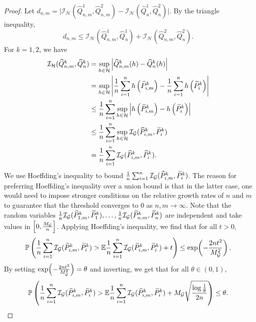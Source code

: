 \begin{proof}
Let $d_{n,m} = \big| \mathcal{I}_{\mathcal{H}}(\widehat{Q}^1_{n,m}, \widehat{Q}^2_{n,m}) - \mathcal{I}_{\mathcal{H}}(\widehat{Q}^1_n,\widehat{Q}^2_n) \big|$. By the triangle inequality,
\[
d_{n,m} \leq \mathcal{I}_\mathcal{H}(\widehat{Q}^1_{n,m}, \widehat{Q}^1_n) + \mathcal{I}_\mathcal{H}(\widehat{Q}^2_{n,m}, \widehat{Q}^2_n).
\]
For $k =1,2$, we have
\begin{align*}
\mathcal{I}_\mathcal{H}(\widehat{Q}^k_{n,m}, \widehat{Q}^k_n) &= \sup_{h \in \mathcal{H}}\left|\widehat{Q}^k_{n,m}(h) - \widehat{Q}^k_n(h) \right|\\
& = \sup_{h\in \mathcal{H}} \left| \frac{1}{n}\sum_{i = 1}^n h\left(\widehat{P}^k_{i,m} \right) - \frac{1}{n}\sum_{i = 1}^n h\left(\widetilde{P}^k_i \right) \right|  \\
& \leq \frac{1}{n}\sum_{i = 1}^n \sup_{h \in \mathcal{H}} \left|h\left(\widehat{P}^k_{i,m} \right)  - h\left(\widetilde{P}^k_i \right)  \right| \\
& \leq \frac{1}{n}\sum_{i = 1}^n \sup_{h \in \mathcal{H}} \mathcal{I}_{\mathcal{G}}(\widehat{P}^k_{i,m},\widetilde{P}^k_i) \\ 
& = \frac{1}{n}\sum_{i = 1}^n \mathcal{I}_{\mathcal{G}}(\widehat{P}^k_{i,m},\widetilde{P}^k_i).
\end{align*}
We use Hoeffding's inequality to bound $\frac{1}{n}\sum_{i = 1}^n \mathcal{I}_{\mathcal{G}}(\widehat{P}^k_{i,m},\widetilde{P}^k_i)$. The reason for preferring Hoeffding's inequality over a union bound is that in the latter case, one would need to impose stronger conditions on the relative growth rates of $n$ and $m$ to guarantee that the threshold converges to $0$ as $n,m \to \infty$.
Note that the random variables $\frac{1}{n}\mathcal{I}_{\mathcal{G}}(\widehat{P}^k_{1,m},\widetilde{P}^k_1), \dots, \frac{1}{n}\mathcal{I}_{\mathcal{G}}(\widehat{P}^k_{n,m},\widetilde{P}^k_n)$ are independent and take values in $\left[ 0, \frac{M_{\mathcal{G}}}{n}\right]$. Applying Hoeffding's inequality, we find that for all $t > 0$,
\[
\mathbb{P}\left(\frac{1}{n}\sum_{i = 1}^n \mathcal{I}_{\mathcal{G}}(\widehat{P}^k_{i,m},\widetilde{P}^k_i) > \mathbb{E} \frac{1}{n}\sum_{i = 1}^n \mathcal{I}_{\mathcal{G}}(\widehat{P}^k_{i,m},\widetilde{P}^k_i) + t \right) \leq \exp\!\left(-\frac{2nt^2}{M_{\mathcal{G}}^2}\right).
\]
By setting $\exp\!\left(-\frac{2nt^2}{M_{\mathcal{G}}^2}\right) = \theta$ and inverting, we get that for all $\theta \in (0,1)$,
\[
\mathbb{P}\left(\frac{1}{n}\sum_{i = 1}^n \mathcal{I}_{\mathcal{G}}(\widehat{P}^k_{i,m},\widetilde{P}^k_i) > \mathbb{E} \frac{1}{n}\sum_{i = 1}^n \mathcal{I}_{\mathcal{G}}(\widehat{P}^k_{i,m},\widetilde{P}^k_i)+ M_{\mathcal{G}} \sqrt{\frac{\log \frac{1}{\theta}}{2n}} \right) \leq \theta.
\]
\end{proof}
